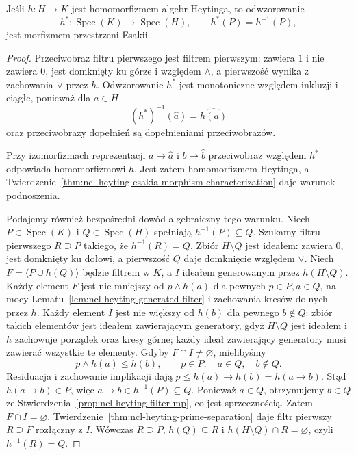 \begin{twierdzenie}
\label{thm:ncl-heyting-dual-map}
Jeśli $h:H\to K$ jest homomorfizmem algebr Heytinga,
to odwzorowanie
\[
 h^*:\operatorname{Spec}(K)\to\operatorname{Spec}(H),
 \qquad h^*(P)=h^{-1}(P),
\]
jest morfizmem przestrzeni Esakii.
\end{twierdzenie}
\begin{proof}
Przeciwobraz filtru pierwszego jest filtrem
pierwszym: zawiera $1$ i nie zawiera $0$,
jest domknięty ku górze i względem $\wedge$,
a pierwszość wynika z zachowania $\vee$ przez $h$.
Odwzorowanie $h^*$ jest monotoniczne względem
inkluzji i ciągłe, ponieważ dla $a\in H$
\[
 (h^*)^{-1}(\widehat a)=\widehat{h(a)}
\]
oraz przeciwobrazy dopełnień są dopełnieniami
przeciwobrazów.

Przy izomorfizmach reprezentacji
$a\mapsto\widehat a$ i $b\mapsto\widehat b$
przeciwobraz względem $h^*$ odpowiada
homomorfizmowi $h$.
Jest zatem homomorfizmem Heytinga, a
Twierdzenie~\ref{thm:ncl-heyting-esakia-morphism-characterization}
daje warunek podnoszenia.

Podajemy również bezpośredni dowód algebraiczny
tego warunku. Niech $P\in\operatorname{Spec}(K)$
i $Q\in\operatorname{Spec}(H)$ spełniają
$h^{-1}(P)\subseteq Q$.
Szukamy filtru pierwszego $R\supseteq P$
takiego, że $h^{-1}(R)=Q$.
Zbiór $H\setminus Q$ jest ideałem: zawiera $0$,
jest domknięty ku dołowi, a pierwszość $Q$
daje domknięcie względem $\vee$.
Niech $F=\langle P\cup h(Q)\rangle$ będzie
filtrem w $K$, a $I$ ideałem generowanym przez
$h(H\setminus Q)$.
Każdy element $F$ jest nie mniejszy od
$p\wedge h(a)$ dla pewnych $p\in P,a\in Q$,
na mocy Lematu~\ref{lem:ncl-heyting-generated-filter}
i zachowania kresów dolnych przez $h$.
Każdy element $I$ jest nie większy od $h(b)$
dla pewnego $b\notin Q$: zbiór takich elementów
jest ideałem zawierającym generatory, gdyż
$H\setminus Q$ jest ideałem i $h$ zachowuje
porządek oraz kresy górne; każdy ideał zawierający
generatory musi zawierać wszystkie te elementy.
Gdyby $F\cap I\ne\varnothing$, mielibyśmy
\[
 p\wedge h(a)\leq h(b),
 \qquad p\in P,\quad a\in Q,\quad b\notin Q.
\]
Residuacja i zachowanie implikacji dają
$p\leq h(a)\to h(b)=h(a\to b)$.
Stąd $h(a\to b)\in P$, więc
$a\to b\in h^{-1}(P)\subseteq Q$.
Ponieważ $a\in Q$, otrzymujemy $b\in Q$
ze Stwierdzenia~\ref{prop:ncl-heyting-filter-mp},
co jest sprzecznością.
Zatem $F\cap I=\varnothing$.
Twierdzenie~\ref{thm:ncl-heyting-prime-separation}
daje filtr pierwszy $R\supseteq F$
rozłączny z $I$. Wówczas $R\supseteq P$,
$h(Q)\subseteq R$ i $h(H\setminus Q)\cap R
=\varnothing$, czyli $h^{-1}(R)=Q$.
\end{proof}

